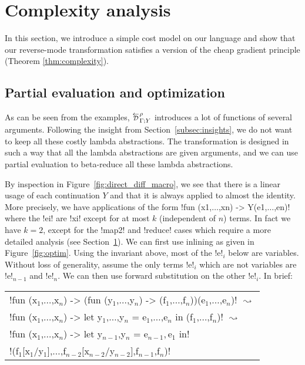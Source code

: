 \section{Complexity analysis}
\label{sec:complexity}

In this section, we introduce a simple cost model on our language and show 
that our reverse-mode transformation satisfies a version of the cheap gradient principle (Theorem \ref{thm:complexity}).

\subsection{Partial evaluation and optimization} %
\label{sub:Partial evaluation and optimization}

As can be seen from the examples, $\directD{\rho}{\Gamma}{Y}$ introduces a lot of functions of several arguments.
Following the insight from Section~\ref{subsec:insights}, we do not want to keep all these costly lambda abstractions.
The transformation is designed in such a way that all the lambda abstractions are given arguments,  
and we can use partial evaluation to beta-reduce all these lambda abstractions.

By inspection in Figure~\ref{fig:direct_diff_macro}, 
we see that there is a linear usage of  each continuation $Y$ 
and that it is always applied to almost the identity. 
More precisely, we have applications of the form !fun (x1,$\ldots$,xn) -> Y(e1,$\ldots$,en)! 
where the !ei! are !xi! except for at most $k$ (independent of $n$) terms.
In fact we have $k=2$, except for the !map2! and !reduce! cases which require a more detailed analysis (see Section~\ref{sec:complexity}).
We can first use inlining as given in Figure~\ref{fig:optim}.
Using the invariant above, most of the !e!$_{i}$ below are variables. 
Without loss of generality, assume the only terms !e!$_{i}$ which are not variables are !e!$_{n-1}$ and !e!$_{n}$.
We can then use forward substitution on the other !e!$_{i}$.
In brief:

\begin{tabular}{l}
!fun (x$_{1}$,$\ldots$,x$_n$) -> (fun (y$_{1}$,$\ldots$,y$_n$) -> (f$_{1}$,$\ldots$,f$_n$))(e$_{1}$,$\ldots$,e$_n$)! 
$\text{ $\leadsto$ }$ \\
!fun (x$_{1}$,$\ldots$,x$_n$) -> let y$_{1}$,$\ldots$,y$_n$ = e$_1$,$\ldots$,e$_n$ in (f$_{1}$,$\ldots$,f$_n$)! $\text{ $\leadsto$ }$ \\
!fun (x$_{1}$,$\ldots$,x$_n$) -> let y$_{n-1}$,y$_n$ = e$_{n-1},$e$_1$ in!\\
\hspace{3cm}!(f$_{1}$[x$_{1}$/y$_{1}$],$\ldots$,f$_{n-2}[$x$_{n-2}$/y$_{n-2}]$,f$_{n-1}$,f$_{n}$)!
\end{tabular}

